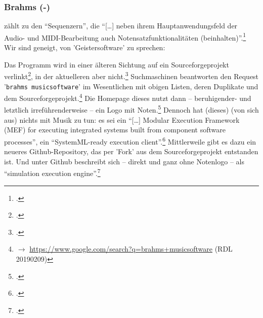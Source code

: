 %
%
%



\subsubsection{Brahms (-)}

\label{Brahms} zählt  zu den \enquote{Sequenzern},
die \enquote{[\ldots] neben ihrem Hauptanwendungsfeld der Audio- und
MIDI-Bearbeitung auch Notensatzfunktionalitäten
(beinhalten)}.\footcite[vgl.][\nopage wp]{WpedNotensatz2019a} Wir sind geneigt,
von 'Geistersoftware' zu sprechen:

Das Programm  wird in einer älteren Sichtung auf ein
Sourceforgeprojekt verlinkt\footcite[vgl.][\nopage wp]{Callon2009a}, in der
aktuelleren aber nicht.\footcite[vgl.][\nopage wp]{WpedNotensatz2019a}
Suchmaschinen beantworten den Request '\texttt{brahms musicsoftware}' im
Wesentlichen mit obigen Listen, deren Duplikate und dem
Sourceforgeprojekt.\footnote{$\rightarrow$
\href{https://www.google.com/search?q=brahms+musicsoftware}
{https://www.google.com/search?q=brahms+musicsoftware} (RDL 20190209)} Die
Homepage dieses  nutzt dann -- beruhigender-
und letztlich irreführenderweise -- ein Logo mit Noten.\footcite[vgl.][\nopage
wp]{Brahms2013a} Dennoch hat (dieses)  (von sich aus) nichts mit
Musik zu tun: es sei ein \enquote{[\ldots] Modular Execution Framework (MEF) for
executing integrated systems built from component software processes}, ein
\enquote{SystemML-ready execution client}.\footcite[vgl.][\nopage
wp]{Brahms2013b} Mittlerweile gibt es dazu ein neueres Github-Repository, das
per 'Fork' aus dem Sourceforgeprojekt entstanden ist. Und unter Github
beschreibt sich  -- direkt und ganz ohne Notenlogo -- als
\enquote{simulation execution engine}.\footcite[vgl.][\nopage wp]{Brahms2018a}

